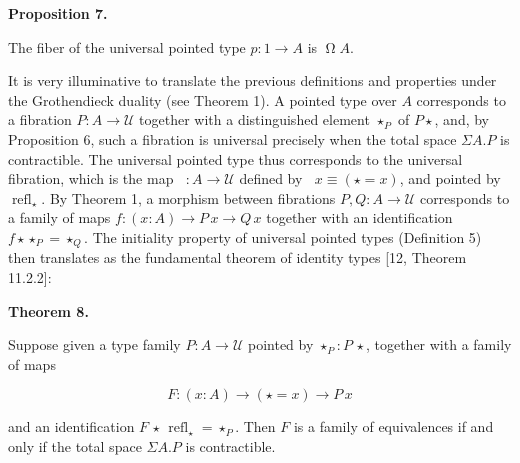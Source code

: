\documentclass[10pt,a4paper]{article}
\begin{document}
 
 
\par\medskip\noindent\textbf{Proposition 7.}\par
 
 
The fiber of the universal pointed type $p:1\to A$ is $\operatorname{\Omega}A$.\par
 
 
 
 
It is very illuminative to translate the previous definitions and properties under the Grothendieck duality (see Theorem 1). A pointed type over $A$ corresponds to a fibration $P:A\to\mathcal{U}$ together with a distinguished element $\star_{P}$ of $P\star$, and, by Proposition 6, such a fibration is universal precisely when the total space $\Sigma A.P$ is contractible. The universal pointed type thus corresponds to the universal fibration, which is the map $\mathop{\mathcal{F}_{A}}:A\to\mathcal{U}$ defined by $\mathop{\mathcal{F}_{A}}x\equiv(\star=x)$, and pointed by $\operatorname{refl}_{\star}$. By Theorem 1, a morphism between fibrations $P,Q:A\to\mathcal{U}$ corresponds to a family of maps $f:(x:A)\to P\,x\to Q\,x$ together with an identification $f\star\star_{P}=\star_{Q}$. The initiality property of universal pointed types (Definition 5) then translates as the fundamental theorem of identity types [12, Theorem 11.2.2]:\par
 
 
 
\par\medskip\noindent\textbf{Theorem 8.}\par
 
 
Suppose given a type family $P:A\to\mathcal{U}$ pointed by $\star_{P}:P\,\star$, together with a family of maps\par
  
\par  \quad  \[F:(x:A)\to(\star=x)\to P\,x\]\quad  \quad  
  
and an identification $F\,\star\,\operatorname{refl}_{\star}=\star_{P}$. Then $F$ is a family of equivalences if and only if the total space $\Sigma A.P$ is contractible.\par
 
\end{document}
